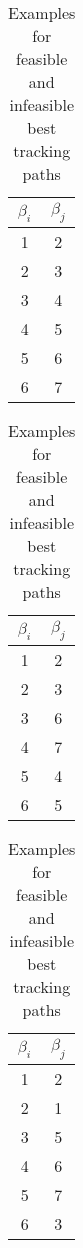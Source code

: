 \begin{table}[!h]
  
  \begin{minipage}{.3\linewidth}
    \caption{\emph{Direct feasible}}
    \centering
      \begin{tabular}{c|c}
        \multicolumn{1}{c}{$\beta_i$} &  \multicolumn{1}{c}{$\beta_j$} \\
          \hline
          \hline
          1 & 2 \\
          \hline
          2 & 3 \\
          \hline
          3 & 4 \\
          \hline
          4 & 5 \\
          \hline
          5 & 6 \\
          \hline
          6 & 7 
          \label{tab_1}
      \end{tabular}
  \end{minipage}
  \begin{minipage}{.3\linewidth}
    \centering
    \caption{feasible}
    \begin{tabular}{c|c}
      \multicolumn{1}{c}{$\beta_i$} &  \multicolumn{1}{c}{$\beta_j$} \\
        \hline
        \hline
        1 & 2 \\
        \hline
        2 & 3 \\
        \hline
        3 & 6 \\
        \hline
        4 & 7 \\
        \hline
        5 & 4 \\
        \hline
        6 & 5 
        \label{tab_2}
      \end{tabular}
    \end{minipage} 
  \begin{minipage}{.3\linewidth}
    \centering
    \caption{infeasible}
    \begin{tabular}{c|c}
      \multicolumn{1}{c}{$\beta_i$} &  \multicolumn{1}{c}{$\beta_j$} \\
        \hline
        \hline
        1 & 2 \\
        \hline 
        2 & 1 \\
        \hline
        3 & 5 \\
        \hline
        4 & 6 \\
        \hline
        5 & 7 \\
        \hline
        6 & 3 
        \label{tab_3}
      \end{tabular}
  \end{minipage} 
  \caption{Examples for feasible and infeasible best tracking paths}
  \label{tab_4}
\end{table}

